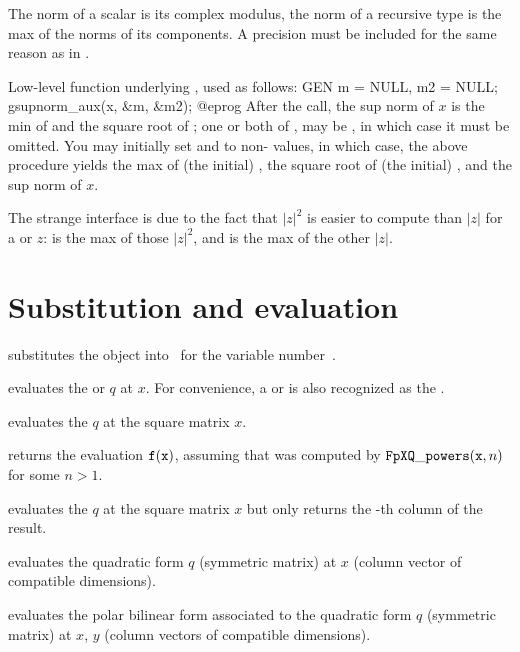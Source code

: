  The norm of a scalar is its complex modulus,
the norm of a recursive type is the max of the norms of its components. A
precision  must be included for the same reason as in .

 Low-level function underlying
, used as follows:
\bprog
  GEN m = NULL, m2 = NULL;
  gsupnorm_aux(x, &m, &m2);
@eprog
After the call, the sup norm of $x$ is the min of  and the square root
of ;  one or both of ,  may be , in
which case it must be omitted. You may initially set  and  to
non- values, in which case, the above procedure yields the max of
(the initial) , the square root of (the initial) , and the sup
norm of $x$.

The strange interface is due to the fact that $|z|^2$ is easier to compute
than $|z|$ for a  or  $z$:  is the max of
those $|z|^2$, and  is the max of the other $|z|$.

\section{Substitution and evaluation}

 substitutes the object 
into~ for the variable number~.

 evaluates the  or 
$q$ at $x$. For convenience, a  or  is also recognized as
the  .

 evaluates the  $q$ at the
square matrix $x$.

 returns
the evaluation ${\tt f}({\tt x})$, assuming that  was computed by
${\tt FpXQ\_powers}({\tt x}, n)$ for some $n>1$.

 evaluates the  $q$
at the square matrix $x$ but only returns the -th column of the result.

 evaluates the quadratic form
$q$ (symmetric matrix) at $x$ (column vector of compatible dimensions).

 evaluates the polar bilinear form
associated to the quadratic form $q$ (symmetric matrix) at $x$, $y$ (column
vectors of compatible dimensions).

